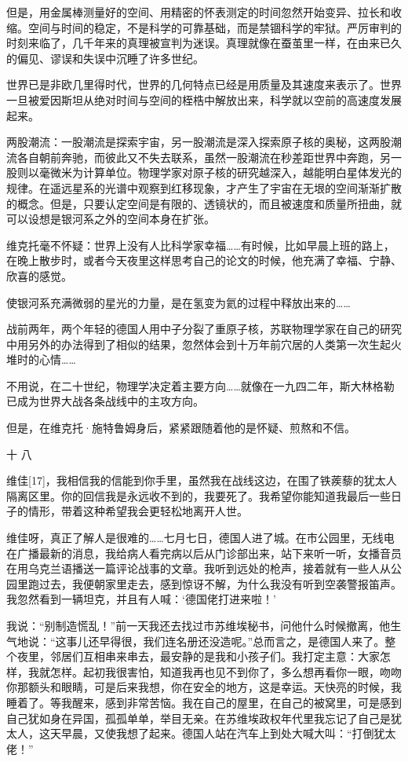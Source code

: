 但是，用金属棒测量好的空间、用精密的怀表测定的时间忽然开始变异、拉长和收缩。空间与时间的稳定，不是科学的可靠基础，而是禁锢科学的牢狱。严厉审判的时刻来临了，几千年来的真理被宣判为迷误。真理就像在蚕茧里一样，在由来已久的偏见、谬误和失误中沉睡了许多世纪。

世界已是非欧几里得时代，世界的几何特点已经是用质量及其速度来表示了。世界一旦被爱因斯坦从绝对时间与空间的桎梏中解放出来，科学就以空前的高速度发展起来。

两股潮流：一股潮流是探索宇宙，另一股潮流是深入探索原子核的奥秘，这两股潮流各自朝前奔驰，而彼此又不失去联系，虽然一股潮流在秒差距世界中奔跑，另一股则以毫微米为计算单位。物理学家对原子核的研究越深入，越能明白星体发光的规律。在遥远星系的光谱中观察到红移现象，才产生了宇宙在无垠的空间渐渐扩散的概念。但是，只要认定空间是有限的、透镜状的，而且被速度和质量所扭曲，就可以设想是银河系之外的空间本身在扩张。

维克托毫不怀疑：世界上没有人比科学家幸福……有时候，比如早晨上班的路上，在晚上散步时，或者今天夜里这样思考自己的论文的时候，他充满了幸福、宁静、欣喜的感觉。

使银河系充满微弱的星光的力量，是在氢变为氦的过程中释放出来的……

战前两年，两个年轻的德国人用中子分裂了重原子核，苏联物理学家在自己的研究中用另外的办法得到了相似的结果，忽然体会到十万年前穴居的人类第一次生起火堆时的心情……

不用说，在二十世纪，物理学决定着主要方向……就像在一九四二年，斯大林格勒已成为世界大战各条战线中的主攻方向。

但是，在维克托·施特鲁姆身后，紧紧跟随着他的是怀疑、煎熬和不信。

十 八

维佳[17]，我相信我的信能到你手里，虽然我在战线这边，在围了铁蒺藜的犹太人隔离区里。你的回信我是永远收不到的，我要死了。我希望你能知道我最后一些日子的情形，带着这种希望我会更轻松地离开人世。

维佳呀，真正了解人是很难的……七月七日，德国人进了城。在市公园里，无线电在广播最新的消息，我给病人看完病以后从门诊部出来，站下来听一听，女播音员在用乌克兰语播送一篇评论战事的文章。我听到远处的枪声，接着就有一些人从公园里跑过去，我便朝家里走去，感到惊讶不解，为什么我没有听到空袭警报笛声。我忽然看到一辆坦克，并且有人喊：‘德国佬打进来啦！’

我说：“别制造慌乱！”前一天我还去找过市苏维埃秘书，问他什么时候撤离，他生气地说：“这事儿还早得很，我们连名册还没造呢。”总而言之，是德国人来了。整个夜里，邻居们互相串来串去，最安静的是我和小孩子们。我打定主意：大家怎样，我就怎样。起初我很害怕，知道我再也见不到你了，多么想再看你一眼，吻吻你那额头和眼睛，可是后来我想，你在安全的地方，这是幸运。天快亮的时候，我睡着了。等我醒来，感到非常苦恼。我在自己的屋里，在自己的被窝里，可是感到自己犹如身在异国，孤孤单单，举目无亲。在苏维埃政权年代里我忘记了自己是犹太人，这天早晨，又使我想了起来。德国人站在汽车上到处大喊大叫：“打倒犹太佬！”

